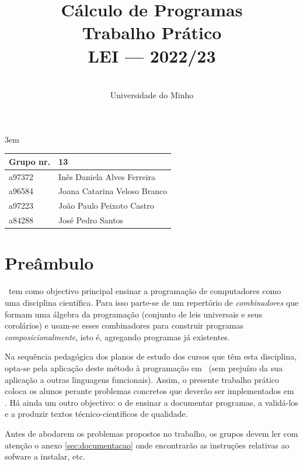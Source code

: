 \documentclass[a4paper]{article}
\title{
          \textbf{Cálculo de Programas}
\\
          Trabalho Prático
\\
          LEI --- 2022/23
}
\author{
          \dium
\\
          Universidade do Minho
}
\date\mydate
\begin{document}
\emergencystretch 3em

\maketitle

\begin{center}\large
\begin{tabular}{ll}
Grupo nr. &13
\\\hline
a97372 & Inês Daniela Alves Ferreira
\\
a96584 & Joana Catarina Veloso Branco
\\
a97223 & João Paulo Peixoto Castro
\\
a84288 & José Pedro Santos

\end{tabular}
\end{center}

\section*{Preâmbulo}

\CP\ tem como objectivo principal ensinar
a progra\-mação de computadores como uma disciplina científica. Para isso
parte-se de um repertório de \emph{combinadores} que formam uma álgebra da
programação (conjunto de leis universais e seus corolários) e usam-se esses
combinadores para construir programas \emph{composicionalmente}, isto é,
agregando programas já existentes.

Na sequência pedagógica dos planos de estudo dos cursos que têm
esta disciplina, opta-se pela aplicação deste método à programação
em \Haskell\ (sem prejuízo da sua aplicação a outras linguagens
funcionais). Assim, o presente trabalho prático coloca os
alunos perante problemas concretos que deverão ser implementados em
\Haskell.  Há ainda um outro objectivo: o de ensinar a documentar
programas, a validá-los e a produzir textos técnico-científicos de
qualidade.

Antes de abodarem os problemas propostos no trabalho, os grupos devem ler
com atenção o anexo \ref{sec:documentacao} onde encontrarão as instruções
relativas ao sofware a instalar, etc.
\end{document}
